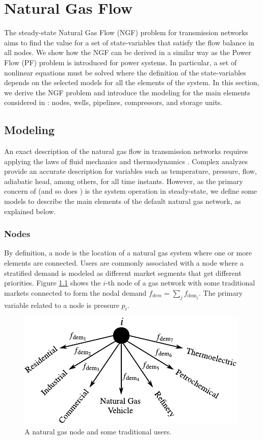 \chapter{Natural Gas Flow}
\label{chap:fund_NGF}

The steady-state Natural Gas Flow (NGF) problem for transmission networks aims to find the value for a set of state-variables that satisfy the flow balance in all nodes. We show how the NGF can be derived in a similar way as the Power Flow (PF) problem is introduced for power systems. In  particular, a set of nonlinear equations must be solved where the definition of the state-variables depends on the selected models for all the elements of the system. In this section, we derive the NGF problem and introduce the modeling for the main elements considered in \mpng{}: nodes, wells, pipelines, compressors, and storage units.

\section{Modeling}
\label{sec:gas_modeling}

An exact description of the natural gas flow in transmission networks requires applying the laws of fluid mechanics and thermodynamics \cite{Osiadacz2001}. Complex analyzes provide an accurate description for variables such as temperature, pressure, flow, adiabatic head, among others, for all time instants. However, as the primary concern of \matpower{} (and so does \mpng{}) is the system operation in steady-state, we define some models to describe the main elements of the default natural gas network, as explained below. 

\subsection{Nodes}
\label{subsec:nodes}

By definition, a node is the location of a natural gas system where one or more elements are connected. Users are commonly associated with a node where a stratified demand is modeled as different market segments that get different priorities. Figure \ref{fig:node} shows the $i$-th node of a gas network with some traditional markets connected to form the nodal demand $f_{dem}=\sum_{j} f_{\text{dem}_j}$. The primary variable related to a node is pressure $p_i$.

\begin{figure}[!ht]
	\centering
	\includegraphics[scale=1.2]{Figures/Node}
	\caption{A natural gas node and some traditional users.}	
	\label{fig:node}
\end{figure}


